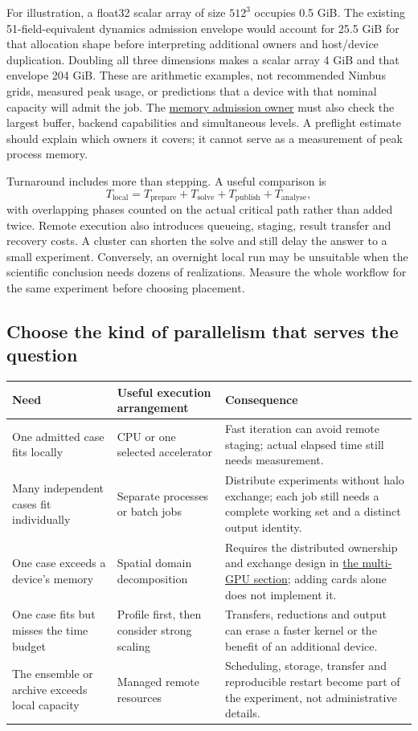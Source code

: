 For illustration, a float32 scalar array of size $512^3$ occupies 0.5 GiB.
The existing 51-field-equivalent dynamics admission envelope would account
for 25.5 GiB for that allocation shape before interpreting additional owners
and host/device duplication. Doubling all three dimensions makes a scalar
array 4 GiB and that envelope 204 GiB. These are arithmetic examples, not
recommended Nimbus grids, measured peak usage, or predictions that a device
with that nominal capacity will admit the job. The
\href{../include/compute/compute_memory_admission.hpp}{memory admission owner}
must also check the largest buffer, backend capabilities and simultaneous
levels. A preflight estimate should explain which owners it covers; it cannot
serve as a measurement of peak process memory.

Turnaround includes more than stepping. A useful comparison is
\[
 T_{\mathrm{local}}=T_{\mathrm{prepare}}+T_{\mathrm{solve}}
                      +T_{\mathrm{publish}}+T_{\mathrm{analyse}},
\]
with overlapping phases counted on the actual critical path rather than
added twice. Remote execution also introduces queueing, staging, result
transfer and recovery costs. A cluster can shorten the solve and still delay
the answer to a small experiment. Conversely, an overnight local run may be
unsuitable when the scientific conclusion needs dozens of realizations.
Measure the whole workflow for the same experiment before choosing placement.

\subsection{Choose the kind of parallelism that serves the question}

\begin{longtable}{@{}>{\raggedright\arraybackslash}p{}>{\raggedright\arraybackslash}p{}>{\raggedright\arraybackslash}p{}@{}}
\toprule
Need & Useful execution arrangement & Consequence \\
\midrule
\endhead
One admitted case fits locally & CPU or one selected accelerator & Fast
iteration can avoid remote staging; actual elapsed time still needs measurement. \\
Many independent cases fit individually & Separate processes or batch jobs &
Distribute experiments without halo exchange; each job still needs a complete
working set and a distinct output identity. \\
One case exceeds a device's memory & Spatial domain decomposition & Requires
the distributed ownership and exchange design in
\hyperref[architecture-multigpu]{the multi-GPU section}; adding cards alone
does not implement it. \\
One case fits but misses the time budget & Profile first, then consider
strong scaling & Transfers, reductions and output can erase a faster kernel
or the benefit of an additional device. \\
The ensemble or archive exceeds local capacity & Managed remote resources &
Scheduling, storage, transfer and reproducible restart become part of the
experiment, not administrative details. \\
\bottomrule
\end{longtable}

